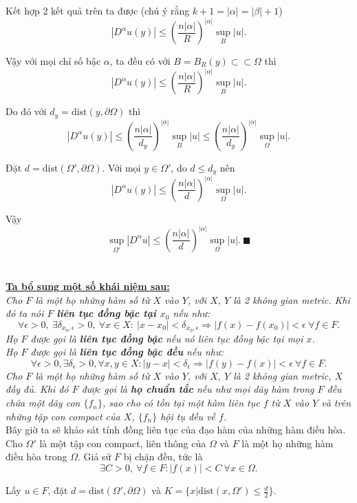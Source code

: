Kết hợp 2 kết quả trên ta được (chú ý rằng $k+1=|\alpha |=|\beta |+1$)
\[ |D^{\alpha}u(y)|\leq(\frac{n|\alpha|}{R})^{|\alpha|}\sup\limits_{B}|u|.\]

Vậy với mọi chỉ số bậc $\alpha$, ta đều có với $B=B_{R}(y)\subset\subset \Omega$ thì
\[ |D^{\alpha}u(y)|\leq(\frac{n|\alpha|}{R})^{|\alpha|}\sup\limits_{B}|u|.\]

Do đó với $d_y=\mbox{dist}(y,\partial\Omega)$ thì
\[ |D^{\alpha}u(y)|\leq(\frac{n|\alpha|}{d_y})^{|\alpha|}\sup\limits_{B}|u|\leq (\frac{n|\alpha|}{d_y})^{|\alpha|}\sup\limits_{\Omega}|u|.\]

Đặt $d=\mbox{dist}(\Omega',\partial\Omega)$. Với mọi $y\in\Omega'$, do $d\leq d_y$ nên
\[ |D^{\alpha}u(y)|\leq (\frac{n|\alpha|}{d})^{|\alpha|}\sup\limits_{\Omega}|u|.\]

Vậy \[ \sup\limits_{\Omega '}|D^{\alpha}u|\leq(\frac{n|\alpha|}{d})^{|\alpha|}\sup\limits_{\Omega}|u|.\  \blacksquare\]
\\
\\
\textbf{\underline{Ta bổ sung một số khái niệm sau:}}
\\
\textit{Cho $F$ là một họ những hàm số từ $X$ vào $Y$, với $X,\ Y$ là 2 không gian metric. Khi đó ta nói $F$ \textbf{liên tục đồng bậc tại $x_0$} nếu như:
\[\forall \epsilon > 0,\ \exists \delta_{x_{0},\epsilon} >0,\ \forall x\in X : \ |x-x_{0}|<\delta_{x_{0},\epsilon} \Rightarrow |f(x)-f(x_{0})|<\epsilon \ \forall f\in F.\]
Họ $F$ được gọi là \textbf{liên tục đồng bậc} nếu nó liên tục đồng bậc tại mọi $x$.
\\
Họ $F$ được gọi là \textbf{liên tục đồng bậc đều} nếu như:
\[ \forall \epsilon > 0, \exists \delta_{\epsilon} >0, \forall x,y\in X : |y-x|<\delta_{\epsilon} \Rightarrow |f(y)-f(x)|<\epsilon \ \forall f\in F.\]
Cho $F$ là một họ những hàm số từ $X$ vào $Y$, với $X,\ Y$ là 2 không gian metric, $X$ đầy đủ. Khi đó $F$ được gọi là \textbf{họ chuẩn tắc} nếu như mọi dãy hàm trong $F$ đều chứa một dãy con $\{f_n\}$, sao cho có tồn tại một hàm liên tục $f$ từ $X$ vào $Y$ và trên những tập con compact của $X$, $\{f_n\}$ hội tụ đều về $f$.}
\\

Bây giờ ta sẽ khảo sát tính đồng liên tục của đạo hàm của những hàm điều hòa.
Cho $\Omega'$ là một tập con compact, liên thông của $\Omega$ và $F$ là một họ những hàm điều hòa trong $\Omega$. Giả sử $F$ bị chặn đều, tức là
\[\exists C>0,\ \forall f\in F: |f(x)|<C \ \forall x\in\Omega.\]

Lấy $u\in F$, đặt $d = \mbox{dist}(\Omega',\partial\Omega)$ và $K=\{x|\mbox{dist}(x,\Omega')\leq \frac{d}{2}\}$.


